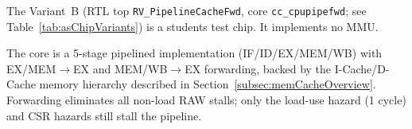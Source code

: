 The \aschip \; Variant~B (RTL top \texttt{RV\_PipelineCacheFwd}, core
\texttt{cc\_cpupipefwd}; see Table~\ref{tab:asChipVariants}) is a students test
chip. It implements no MMU.

The core is a 5-stage pipelined implementation (IF/ID/EX/MEM/WB) with
EX/MEM$\to$EX and MEM/WB$\to$EX forwarding, backed by the I-Cache/D-Cache memory
hierarchy described in Section~\ref{subsec:memCacheOverview}. Forwarding
eliminates all non-load RAW stalls; only the load-use hazard (1 cycle) and CSR
hazards still stall the pipeline.
